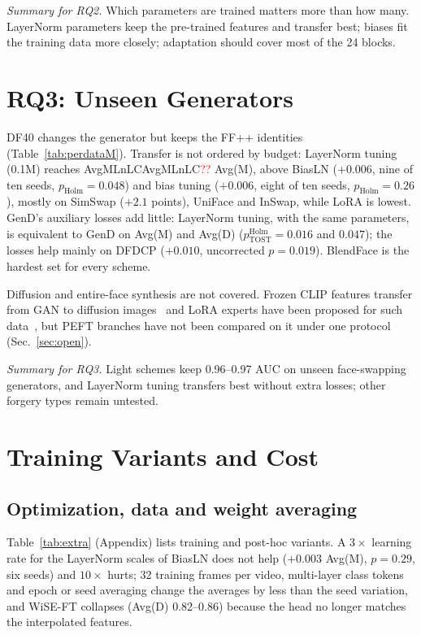 \documentclass[fonts]{icst}
\newcommand{\num}[1]{\ifcsname #1\endcsname\csname #1\endcsname\else\textcolor{red}{??}\fi}
\begin{document}
\textit{Summary for RQ2.} Which parameters are trained matters more than how many. LayerNorm parameters keep the pre-trained features and transfer best; biases fit the training data more closely; adaptation should cover most of the 24 blocks.

\section{RQ3: Unseen Generators}
\label{sec:rq3}


DF40 changes the generator but keeps the FF++ identities (Table~\ref{tab:perdataM}). Transfer is not ordered by budget: LayerNorm tuning (0.1M) reaches \num{AvgMLnLC} Avg(M), above BiasLN ($+0.006$, nine of ten seeds, $p_{\mathrm{Holm}}=0.048$) and bias tuning ($+0.006$, eight of ten seeds, $p_{\mathrm{Holm}}=0.26$), mostly on SimSwap ($+2.1$ points), UniFace and InSwap, while LoRA is lowest. GenD's auxiliary losses add little: LayerNorm tuning, with the same parameters, is equivalent to GenD on Avg(M) and Avg(D) ($p^{\mathrm{Holm}}_{\mathrm{TOST}}=0.016$ and $0.047$); the losses help mainly on DFDCP ($+0.010$, uncorrected $p=0.019$). BlendFace is the hardest set for every scheme.

Diffusion and entire-face synthesis are not covered. Frozen CLIP features transfer from GAN to diffusion images~\cite{ojha2023universal} and LoRA experts have been proposed for such data~\cite{liu2024mole}, but PEFT branches have not been compared on it under one protocol (Sec.~\ref{sec:open}).

\textit{Summary for RQ3.} Light schemes keep 0.96--0.97 AUC on unseen face-swapping generators, and LayerNorm tuning transfers best without extra losses; other forgery types remain untested.

\section{Training Variants and Cost}
\label{sec:variants}

\subsection{Optimization, data and weight averaging}
\label{sec:extra}
Table~\ref{tab:extra} (Appendix) lists training and post-hoc variants. A $3\times$ learning rate for the LayerNorm scales of BiasLN does not help ($+0.003$ Avg(M), $p=0.29$, six seeds) and $10\times$ hurts; 32 training frames per video, multi-layer class tokens and epoch or seed averaging change the averages by less than the seed variation, and WiSE-FT collapses (Avg(D) 0.82--0.86) because the head no longer matches the interpolated features.
\end{document}
